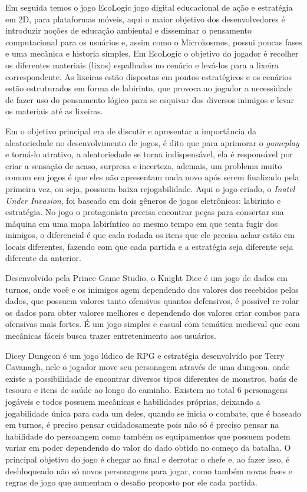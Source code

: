 \documentclass[12pt]{article}
\begin{document}
Em seguida temos o jogo EcoLogic \cite{de2018ecologic} jogo digital educacional de ação e estratégia em 2D, para plataformas móveis, aqui o maior objetivo dos desenvolvedores é introduzir noções de educação ambiental e disseminar o pensamento computacional para os usuários e, assim como o Microkosmos, possui poucas fases e uma mecânica e historia simples. Em EcoLogic o objetivo do jogador é recolher os diferentes materiais (lixos) espalhados no cenário e levá-los para a lixeira correspondente. As lixeiras estão dispostas em pontos estratégicos e os cenários estão estruturados em forma de labirinto, que provoca ao jogador a necessidade de fazer uso do pensamento lógico para se esquivar dos diversos inimigos e levar os materiais até as lixeiras.

Em \cite{correaimportancia} o objetivo principal era de discutir e apresentar a importância da aleatoriedade no desenvolvimento de jogos, é dito que para aprimorar o \emph{gameplay} e torná-lo atrativo, a aleatoriedade se torna indispensável, ela é responsável por criar a sensação de acaso, surpresa e incerteza, ademais, um problema muito comum em jogos é que eles não apresentam nada novo após serem finalizado pela primeira vez, ou seja, possuem baixa rejogabilidade. Aqui o jogo criado, o \emph{Inatel Under Invasion}, foi baseado em dois gêneros de jogos eletrônicos: labirinto e estratégia. No jogo o protagonista precisa encontrar peças para consertar sua máquina em uma mapa labiríntico ao mesmo tempo em que tenta fugir dos inimigos, o diferencial é que cada rodada os itens que ele precisa achar estão em locais diferentes, fazendo com  que cada partida e a estratégia seja diferente seja diferente da anterior.

Desenvolvido pela Prince Game Studio, o Knight Dice \cite{knight} é um jogo de dados em turnos, onde você e os inimigos agem dependendo dos valores dos recebidos pelos dados, que possuem valores tanto ofensivos quantos defensivos, é possível re-rolar os dados para obter valores melhores e dependendo dos valores criar combos para ofensivas mais fortes. É um jogo simples e casual com temática medieval que com mecânicas fáceis busca trazer entretenimento aos usuários.

Dicey Dungeon \cite{dicey} é um jogo lúdico de RPG e estratégia desenvolvido por Terry Cavanagh, nele o jogador move seu personagem através de uma dungeon, onde existe a possibilidade de encontrar diversos tipos diferentes de monstros, baús de tesouro e itens de saúde ao longo do caminho. Existem no total 6 personagens jogáveis e todos possuem mecânicas e habilidades próprias, deixando a jogabilidade única para cada um deles, quando se inicia o combate, que é baseado em turnos, é preciso pensar cuidadosamente pois não só é preciso pensar na habilidade do persoangem como também os equipamentos que possuem podem variar em poder dependendo do valor do dado obtido no começo da batalha. O principal objetivo do jogo é chegar ao final e derrotar o chefe e, ao fazer isso, é desbloqueado não só novos personagens para jogar, como também novas fases e regras de jogo que aumentam o desafio proposto por ele cada partida.
\end{document}
